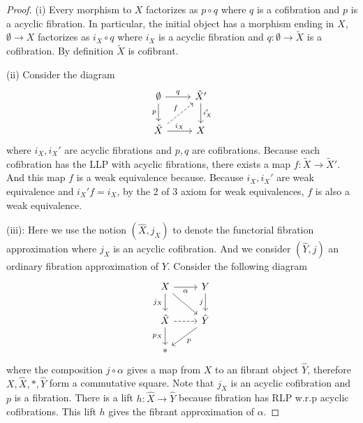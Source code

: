\documentclass[11pt]{article}
\newcommand{\lrta}{\longrightarrow}
\begin{document}
\begin{proof}
(i) Every morphism to $X$ factorizes as $p\circ q$ where $q$ is a cofibration and $p$ is a acyclic fibration. In particular, the initial object has a morphism ending in $X$, $\emptyset\lrta X$ factorizes as $i_X\circ q$ where $i_X$ is a acyclic fibration and $q:\emptyset\lrta \tilde{X}$ is a  cofibration.  By definition $\tilde{X}$ is cofibrant.

(ii) Consider the diagram
$$
\begin{tikzcd}
\emptyset \arrow[d, "p"'] \arrow[r, "q"] & \tilde{X}' \arrow[d, "i_{X}'"] \\
\tilde{X} \arrow[r, "i_X"] \arrow[ru, "f", dashed] & X
\end{tikzcd}
$$
where $i_X,i_X'$ are acyclic fibrations and $p,q$ are cofibrations. Because each  cofibration has the LLP with acyclic fibrations, there exists a map $f: \tilde{X}\lrta \tilde{X}'$. And this map $f$ is a weak equivalence because. Because $i_X, i_X'$ are weak equivalence and $i_X'f=i_X$, by the 2 of 3 axiom for weak equivalences, $f$ is also a weak equivalence.

(iii): Here we use the notion $(\hat{X},j_X)$ to denote the functorial fibration approximation where $j_X$ is an acyclic cofibration. And we consider $(\hat{Y},j)$ an ordinary fibration approximation of $Y$. Consider the following diagram
$$
\begin{tikzcd}
X \arrow[r, "\alpha"'] \arrow[d, "j_X"'] \arrow[rd] & Y \arrow[d, "j"'] \\
\hat{X} \arrow[r, dashed] \arrow[d, "p_X"'] & \hat{Y} \arrow[ld, "p"] \\
* & 
\end{tikzcd}
$$
where the composition $j\circ \alpha$ gives a map from $X$ to an fibrant object $\hat{Y}$, therefore $X,\hat{X},*, \hat{Y}$ form a  commutative square. Note that $j_X$ is an acyclic cofibration and $p$ is a fibration. There is a lift $h:\hat{X}\lrta \hat{Y}$ because fibration has RLP w.r.p acyclic cofibrations. This lift $h$ gives the fibrant approximation of $\alpha$.
\end{proof}
\end{document}

